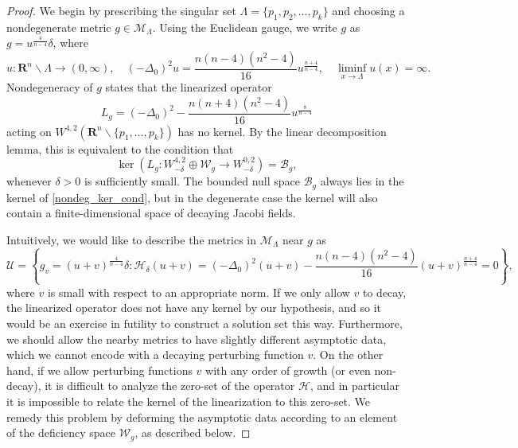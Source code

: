 \documentclass[reqno,11pt]{amsart}
\theoremstyle{tttheorem}
\newcommand{\R}{\mathbf{R}}
\begin{document}
\begin{proof} We begin by prescribing the singular set $\Lambda = 
\{ p_1, p_2, \dots, p_k\}$ and choosing a nondegenerate metric 
$g \in \mathcal{M}_\Lambda$. Using the Euclidean gauge, we write $g$ as 
$g = u^{\frac{4}{n-4}} \delta$, where 
$$u:\R^n \backslash \Lambda \rightarrow (0,\infty), \quad 
(-\Delta_0)^2 u = \frac{n(n-4)(n^2-4)}{16} u^{\frac{n+4}{n-4}}, \quad 
\liminf_{x \rightarrow \Lambda} u(x) = \infty.$$
Nondegeneracy of $g$ states that the linearized operator 
$$L_g = (-\Delta_0)^2 - \frac{n(n+4)(n^2-4)}{16} u^{\frac{8}{n-4}}$$
acting on $W^{4,2}(\R^n\backslash \{ p_1, \dots, p_k\})$ has no 
kernel. By the linear decomposition lemma, this is equivalent to the condition that 
\begin{equation} \label{nondeg_ker_cond}
\ker(L_g : W^{4,2}_{-\delta} \oplus \mathcal{W}_g \rightarrow 
W^{0,2}_{-\delta}) = \mathcal{B}_g,\end{equation}
whenever $\delta> 0$ is sufficiently small. 
The bounded null space $\mathcal{B}_g$ always lies in 
the kernel of \eqref{nondeg_ker_cond}, but in the degenerate case 
the kernel will also contain a finite-dimensional space of decaying 
Jacobi fields. 

Intuitively, we would like to describe the metrics in $\mathcal{M}_\Lambda$ 
near $g$ as 
$$\mathcal{U} = \left \{ g_v = (u+v)^{\frac{4}{n-4}} \delta : 
\mathcal{H}_\delta(u+v) = (-\Delta_0)^2(u+v) - \frac{n(n-4)(n^2-4)}{16} 
(u+v)^{\frac{n+4}{n-4}} = 0 \right \}, $$
where $v$ is small with respect to an appropriate norm. If we only allow 
$v$ to decay, the linearized operator does not have any kernel by our 
hypothesis, and so it would be an exercise in futility to construct a 
solution set this way. Furthermore, we should allow the nearby metrics to 
have slightly different asymptotic data, which we cannot encode 
with a decaying perturbing function $v$. On the other hand, if we 
allow perturbing functions $v$ with any order of growth (or even non-decay), 
it is difficult to analyze the zero-set of the operator $\mathcal{H}$, 
and in particular it is impossible to relate the kernel of the 
linearization to this zero-set. We remedy this problem by deforming 
the asymptotic data according to an element of the deficiency space 
$\mathcal{W}_g$, as described below. 


\end{proof}
\end{document}
